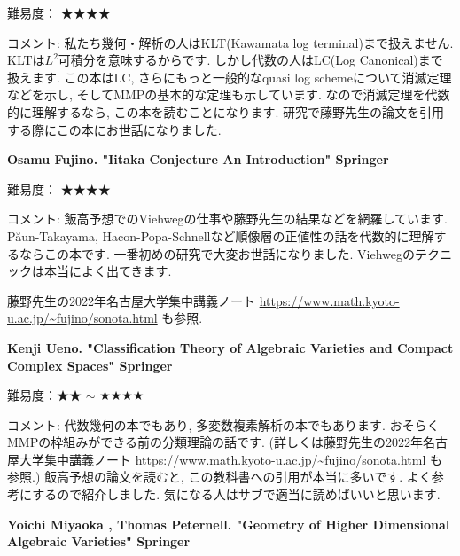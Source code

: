 難易度： ★★★★\vspace{-6pt} 

コメント: 私たち幾何・解析の人はKLT(Kawamata log terminal)まで扱えません. KLTは$L^2$可積分を意味するからです. しかし代数の人はLC(Log Canonical)まで扱えます. この本はLC, さらにもっと一般的なquasi log schemeについて消滅定理などを示し, そしてMMPの基本的な定理も示しています. 
なので消滅定理を代数的に理解するなら, この本を読むことになります. 
研究で藤野先生の論文を引用する際にこの本にお世話になりました. 


\vspace{8pt}


\textbf{Osamu Fujino. "Iitaka Conjecture An Introduction" Springer} \vspace{-6pt}

難易度： ★★★★\vspace{-6pt} 

コメント: 飯高予想でのViehwegの仕事や藤野先生の結果などを網羅しています. P\u{a}un-Takayama, Hacon-Popa-Schnellなど順像層の正値性の話を代数的に理解するならこの本です.  
一番初めの研究で大変お世話になりました. Viehwegのテクニックは本当によく出てきます. 

藤野先生の2022年名古屋大学集中講義ノート \url{https://www.math.kyoto-u.ac.jp/~fujino/sonota.html} も参照. 
\vspace{8pt}


\textbf{Kenji Ueno. "Classification Theory of Algebraic Varieties and Compact Complex Spaces" Springer}  　\vspace{-6pt} 

難易度：★★ $\sim$ ★★★★  　\vspace{-6pt} 

コメント: 代数幾何の本でもあり, 多変数複素解析の本でもあります. おそらくMMPの枠組みができる前の分類理論の話です. (詳しくは藤野先生の2022年名古屋大学集中講義ノート \url{https://www.math.kyoto-u.ac.jp/~fujino/sonota.html} も参照.) 
飯高予想の論文を読むと, この教科書への引用が本当に多いです. 
よく参考にするので紹介しました. 気になる人はサブで適当に読めばいいと思います. 
\vspace{8pt}

\textbf{Yoichi Miyaoka , Thomas Peternell. "Geometry of Higher Dimensional Algebraic Varieties" Springer} \vspace{-6pt}

